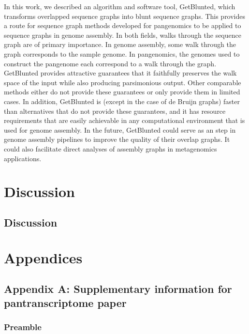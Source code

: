 \documentclass[11pt]{ucthesis}
\begin{document}
In this work, we described an algorithm and software tool, GetBlunted, which transforms overlapped sequence graphs into blunt sequence graphs. 
This provides a route for sequence graph methods developed for pangenomics to be applied to sequence graphs in genome assembly.
In both fields, walks through the sequence graph are of primary importance.
In genome assembly, some walk through the graph corresponds to the sample genome.
In pangenomics, the genomes used to construct the pangenome each correspond to a walk through the graph.
GetBlunted provides attractive guarantees that it faithfully preserves the walk space of the input while also producing parsimonious output.
Other comparable methods either do not provide these guarantees or only provide them in limited cases.
In addition, GetBlunted is (except in the case of de Bruijn graphs) faster than alternatives that do not provide these guarantees, and it has resource requirements that are easily achievable in any computational environment that is used for genome assembly.
In the future, GetBlunted could serve as an step in genome assembly pipelines to improve the quality of their overlap graphs.
It could also facilitate direct analyses of assembly graphs in metagenomics applications.

\part{Discussion}

\chapter{Discussion}
\label{chapter:discussion}


\renewcommand{\figurename}{Supplementary Figure}
\renewcommand{\tablename}{Supplementary Table}

\appendix

\part{Appendices}

\chapter{Appendix A: Supplementary information for pantranscriptome paper}

\section{Preamble}
\end{document}
